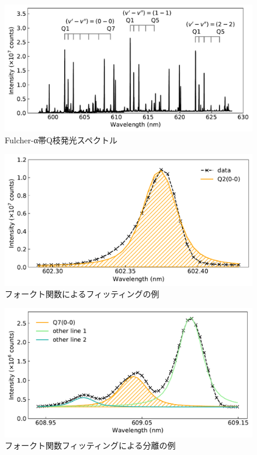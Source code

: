 \begin{figure}
    \centering
    \includegraphics[width=15cm]{pictures/all-spectrum.pdf}
    \caption{Fulcher-α帯Q枝発光スペクトル}
    \label{fig:all-spectrum}
\end{figure}

\begin{figure}
    \centering
    \includegraphics[width=15cm]{pictures/voigt-fitting-1.pdf}
    \caption{フォークト関数によるフィッティングの例}
    \label{fig:voigt-fitting-1}
\end{figure}

\begin{figure}
    \centering
    \includegraphics[width=15cm]{pictures/voigt-fitting-2.pdf}
    \caption{フォークト関数フィッティングによる分離の例}
    \label{fig:voigt-fitting-2}
\end{figure}


